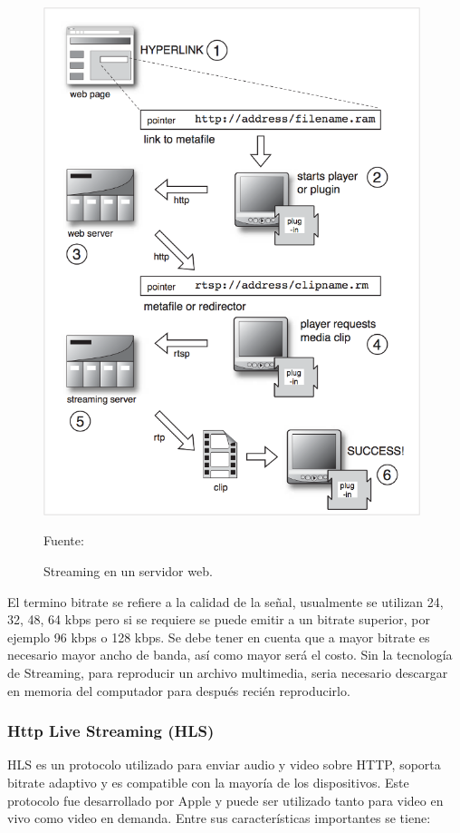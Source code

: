\begin{figure}[H]
    \begin{center}
        \includegraphics[width=11cm]{img/capitulo_2/streamming.png}
    \end{center}
    \begin{center}
        \caption{Streaming en un servidor web.}
        Fuente: \cite{streamming:austerberry}
        \label{fig:streamming}
    \end{center}
\end{figure}

El termino bitrate se refiere a la calidad de la señal, usualmente se utilizan 24, 32, 48, 64 kbps pero si se requiere se puede emitir a un bitrate superior, por ejemplo 96 kbps o 128 kbps. Se debe tener en cuenta que a mayor bitrate es necesario mayor ancho de banda, así como mayor será el costo. Sin la tecnología de Streaming, para reproducir un archivo multimedia, seria necesario descargar en memoria del computador para después recién reproducirlo.\\

\subsubsection{Http Live Streaming (HLS)}
HLS es un protocolo utilizado para enviar audio y video sobre HTTP, soporta bitrate adaptivo y es compatible con la mayoría de los dispositivos. Este protocolo fue desarrollado por Apple y puede ser utilizado tanto para video en vivo como video en demanda. Entre sus características importantes se tiene:

